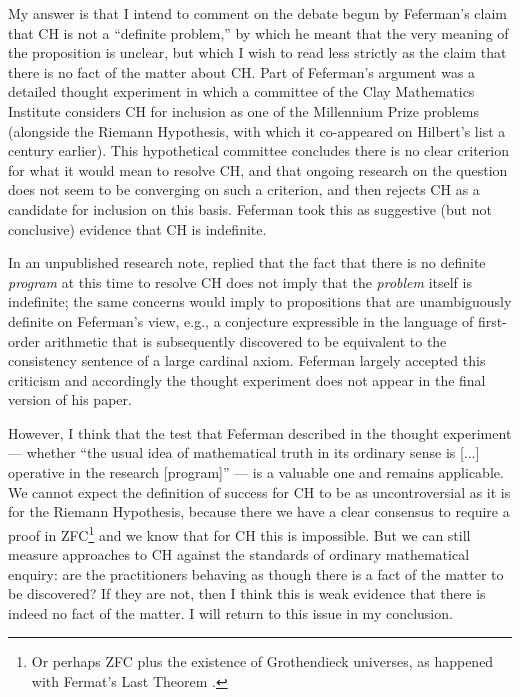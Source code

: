 \documentclass[letterpaper,12pt]{article}
\begin{document}
My answer is that I intend to comment on the debate begun by Feferman's claim \citeyearpar{feferman2011ch} that CH is not a ``definite problem,'' by which he meant that the very meaning of the proposition is unclear, but which I wish to read less strictly as the claim that there is no fact of the matter about CH. Part of Feferman's argument was a detailed thought experiment in which a committee of the Clay Mathematics Institute considers CH for inclusion as one of the Millennium Prize problems (alongside the Riemann Hypothesis, with which it co-appeared on Hilbert's list a century earlier). This hypothetical committee concludes there is no clear criterion for what it would mean to resolve CH, and that ongoing research on the question does not seem to be converging on such a criterion, and then rejects CH as a candidate for inclusion on this basis. Feferman took this as suggestive (but not conclusive) evidence that CH is indefinite.

In an unpublished research note, \cite{koellner2012fefermanreply} replied that the fact that there is no definite \emph{program} at this time to resolve CH does not imply that the \emph{problem} itself is indefinite; the same concerns would imply to propositions that are unambiguously definite on Feferman's view, e.g., a conjecture expressible in the language of first-order arithmetic that is subsequently discovered to be equivalent to the consistency sentence of a large cardinal axiom. Feferman largely accepted this criticism and accordingly the thought experiment does not appear in the final version \citeyearpar{feferman2015chfinal} of his paper.

However, I think that the test that Feferman described in the thought experiment --- whether ``the usual idea of mathematical truth in its ordinary sense is [...] operative in the research [program]'' --- is a valuable one and remains applicable. We cannot expect the definition of success for CH to be as uncontroversial as it is for the Riemann Hypothesis, because there we have a clear consensus to require a proof in ZFC\footnote{Or perhaps ZFC plus the existence of Grothendieck universes, as happened with Fermat's Last Theorem \citep{mclarty2010flt}.} and we know that for CH this is impossible. But we can still measure approaches to CH against the standards of ordinary mathematical enquiry: are the practitioners behaving as though there is a fact of the matter to be discovered? If they are not, then I think this is weak evidence that there is indeed no fact of the matter. I will return to this issue in my conclusion.
\end{document}
